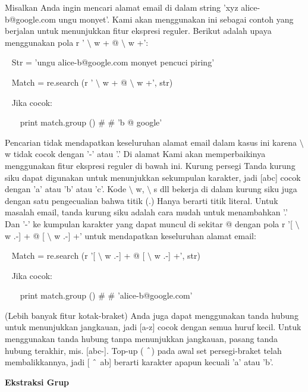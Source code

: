 \begin{12pt}
\begin{12pt}
\begin{12pt}
\begin{12pt}
\begin{12pt}
\begin{12pt}
\begin{12pt}
Misalkan Anda ingin mencari alamat email di dalam string 'xyz alice-b@google.com ungu monyet'. Kami akan menggunakan ini sebagai contoh yang berjalan untuk menunjukkan fitur ekspresi reguler. Berikut adalah upaya menggunakan pola r ' $  \setminus  $ w + @  $  \setminus  $ w +': \par
\vspace{12pt}
\noindent 
~ Str = 'ungu alice-b@google.com monyet pencuci piring' \par
\noindent 
~ Match = re.search (r ' $  \setminus  $ w + @  $  \setminus  $ w +', str) \par
\noindent 
~ Jika cocok: \par
\noindent 
~~~ print match.group ()  $  \#  $ $  \#  $ 'b @ google' \par
\vspace{12pt}
Pencarian tidak mendapatkan keseluruhan alamat email dalam kasus ini karena  $  \setminus  $ w tidak cocok dengan '-' atau '.' Di alamat Kami akan memperbaikinya menggunakan fitur ekspresi reguler di bawah ini. Kurung persegi Tanda kurung siku dapat digunakan untuk menunjukkan sekumpulan karakter, jadi [abc] cocok dengan 'a' atau 'b' atau 'c'. Kode  $  \setminus  $ w,  $  \setminus  $ s dll bekerja di dalam kurung siku juga dengan satu pengecualian bahwa titik (.) Hanya berarti titik literal. Untuk masalah email, tanda kurung siku adalah cara mudah untuk menambahkan '.' Dan '-' ke kumpulan karakter yang dapat muncul di sekitar @ dengan pola r '[ $  \setminus  $ w .-] + @ [ $  \setminus  $ w .-] +' untuk mendapatkan keseluruhan alamat email: \par
\vspace{12pt}
\noindent 
~ Match = re.search (r '[ $  \setminus  $ w .-] + @ [ $  \setminus  $ w .-] +', str) \par
\noindent 
~ Jika cocok: \par
\noindent 
~~~ print match.group ()  $  \#  $ $  \#  $ 'alice-b@google.com' \par
\vspace{12pt}
(Lebih banyak fitur kotak-braket) Anda juga dapat menggunakan tanda hubung untuk menunjukkan jangkauan, jadi [a-z] cocok dengan semua huruf kecil. Untuk menggunakan tanda hubung tanpa menunjukkan jangkauan, pasang tanda hubung terakhir, mis. [abc-]. Top-up ( $  \string^  $) pada awal set persegi-braket telah membalikkannya, jadi [ $  \string^  $ ab] berarti karakter apapun kecuali 'a' atau 'b'. \par
\vspace{16pt}
{\fontsize{14pt}{14pt}\selectfont \textbf{Ekstraksi Grup} \\} \par

\end{12pt}
\end{12pt}
\end{12pt}
\end{12pt}
\end{12pt}
\end{12pt}
\end{12pt}
